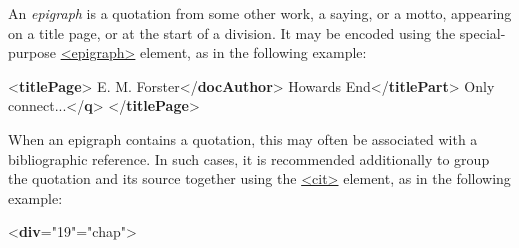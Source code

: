 An \textit{epigraph} is a quotation from some other work, a saying, or a motto, appearing on a title page, or at the start of a division. It may be encoded using the special-purpose \hyperref[TEI.epigraph]{<epigraph>} element, as in the following example: \par\bgroup{}\exampleFont \begin{shaded}\noindent\mbox{}{<\textbf{titlePage}>}\mbox{}\newline 
{}E. M. Forster{</\textbf{docAuthor}>}\mbox{}\newline 
{}\mbox{}\newline 
\hspace*{1em}Howards End{</\textbf{titlePart}>}\mbox{}\newline 
{}\mbox{}\newline 
{}\mbox{}\newline 
\hspace*{1em}Only connect...{</\textbf{q}>}\mbox{}\newline 
{}\mbox{}\newline 
{</\textbf{titlePage}>}\end{shaded}\egroup\par \noindent  When an epigraph contains a quotation, this may often be associated with a bibliographic reference. In such cases, it is recommended additionally to group the quotation and its source together using the \hyperref[TEI.cit]{<cit>} element, as in the following example: \par\bgroup{}\exampleFont \begin{shaded}\noindent\mbox{}{<\textbf{div}\hspace*{1em}{n}="{19}"\hspace*{1em}{type}="{chap}">}\mbox{}\newline 

\end{shaded}
